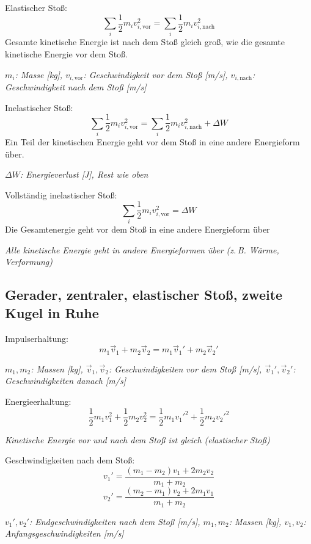\documentclass[a4paper,10pt]{article}
\newenvironment{displayformula}
{
	\begin{framed}
		\color{formulaColor}
	}
	{\end{framed}}
\newcommand{\formulalegend}[1]{%
	\par\vspace{0.5ex}%
	{{\color{legendColor}\RaggedRight\small\textit{#1}}}%
	\par\vspace{1.5ex}%
}
\begin{document}
\begin{displayformula}
	Elastischer Stoß:
	\[
	\sum_i \frac{1}{2} m_i v_{i,\text{vor}}^2 = \sum_i \frac{1}{2} m_i v_{i,\text{nach}}^2
	\]
	Gesamte kinetische Energie ist nach dem Stoß gleich groß, wie die gesamte kinetische Energie vor dem Stoß.
\end{displayformula}
\formulalegend{
	\( m_i \): Masse [kg], \( v_{i,\text{vor}} \): Geschwindigkeit vor dem Stoß [m/s], \( v_{i,\text{nach}} \): Geschwindigkeit nach dem Stoß [m/s]
}

\begin{displayformula}
	Inelastischer Stoß:
	\[
	\sum_i \frac{1}{2} m_i v_{i,\text{vor}}^2 = \sum_i \frac{1}{2} m_i v_{i,\text{nach}}^2 + \Delta W
	\]
	Ein Teil der kinetischen Energie geht vor dem Stoß in eine andere Energieform über.
\end{displayformula}
\formulalegend{
	\( \Delta W \): Energieverlust [J], Rest wie oben
}
\begin{displayformula}
	Vollständig inelastischer Stoß:
	\[
	\sum_i \frac{1}{2} m_i v_{i,\text{vor}}^2 = \Delta W
	\]
	Die Gesamtenergie geht vor dem Stoß in eine andere Energieform über
\end{displayformula}
\formulalegend{
	Alle kinetische Energie geht in andere Energieformen über (z.\,B. Wärme, Verformung)
}

\subsection{Gerader, zentraler, elastischer Stoß, zweite Kugel in Ruhe}

\begin{displayformula}
	Impulserhaltung:
	\[
	m_1 \vec{v}_1 + m_2 \vec{v}_2 = m_1 \vec{v}_1' + m_2 \vec{v}_2'
	\]
\end{displayformula}
\formulalegend{
	\( m_1, m_2 \): Massen [kg], \( \vec{v}_1, \vec{v}_2 \): Geschwindigkeiten vor dem Stoß [m/s], \( \vec{v}_1', \vec{v}_2' \): Geschwindigkeiten danach [m/s]
}

\begin{displayformula}
	Energieerhaltung:
	\[
	\frac{1}{2} m_1 v_1^2 + \frac{1}{2} m_2 v_2^2 = \frac{1}{2} m_1 {v_1'}^2 + \frac{1}{2} m_2 {v_2'}^2
	\]
\end{displayformula}
\formulalegend{
	Kinetische Energie vor und nach dem Stoß ist gleich (elastischer Stoß)
}

\begin{displayformula}
	Geschwindigkeiten nach dem Stoß:
	\[
	v_1' = \frac{(m_1 - m_2) v_1 + 2 m_2 v_2}{m_1 + m_2}
	\]
	\[
	v_2' = \frac{(m_2 - m_1) v_2 + 2 m_1 v_1}{m_1 + m_2}
	\]
\end{displayformula}
\formulalegend{
	\( v_1', v_2' \): Endgeschwindigkeiten nach dem Stoß [m/s], \( m_1, m_2 \): Massen [kg], \( v_1, v_2 \): Anfangsgeschwindigkeiten [m/s]
}
\end{document}
